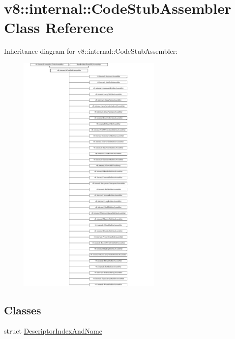 \hypertarget{classv8_1_1internal_1_1CodeStubAssembler}{}\section{v8\+:\+:internal\+:\+:Code\+Stub\+Assembler Class Reference}
\label{classv8_1_1internal_1_1CodeStubAssembler}
Inheritance diagram for v8\+:\+:internal\+:\+:Code\+Stub\+Assembler\+:\begin{figure}[H]
\begin{center}
\leavevmode
\includegraphics[height=12.000000cm]{classv8_1_1internal_1_1CodeStubAssembler}
\end{center}
\end{figure}
\subsection*{Classes}
\begin{DoxyCompactItemize}
\item 
struct \mbox{\hyperlink{structv8_1_1internal_1_1CodeStubAssembler_1_1DescriptorIndexAndName}{Descriptor\+Index\+And\+Name}}
\end{DoxyCompactItemize}
